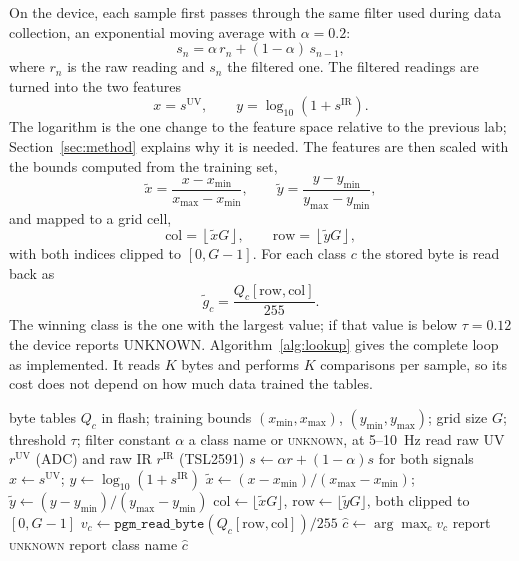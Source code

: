 \documentclass[10pt,a4paper,twocolumn]{article}
\begin{document}
On the device, each sample first passes through the same filter used during data collection, an exponential moving average with $\alpha = 0.2$:
\begin{equation}
s_n = \alpha\, r_n + (1-\alpha)\, s_{n-1},
\label{eq:ema}
\end{equation}
where $r_n$ is the raw reading and $s_n$ the filtered one. The filtered readings are turned into the two features
\begin{equation}
x = s^{\mathrm{UV}}, \qquad y = \log_{10}\!\left(1 + s^{\mathrm{IR}}\right).
\label{eq:features}
\end{equation}
The logarithm is the one change to the feature space relative to the previous lab; Section~\ref{sec:method} explains why it is needed. The features are then scaled with the bounds computed from the training set,
\begin{equation}
\tilde{x} = \frac{x-x_{\min}}{x_{\max}-x_{\min}},
\qquad
\tilde{y} = \frac{y-y_{\min}}{y_{\max}-y_{\min}},
\label{eq:scale}
\end{equation}
and mapped to a grid cell,
\begin{equation}
\mathrm{col} = \left\lfloor \tilde{x}G \right\rfloor,
\qquad
\mathrm{row} = \left\lfloor \tilde{y}G \right\rfloor,
\label{eq:index}
\end{equation}
with both indices clipped to $[0,G-1]$. For each class $c$ the stored byte is read back as
\begin{equation}
\tilde{g}_c = \frac{Q_c[\mathrm{row},\mathrm{col}]}{255}.
\label{eq:dequant}
\end{equation}
The winning class is the one with the largest value; if that value is below $\tau=0.12$ the device reports UNKNOWN. Algorithm~\ref{alg:lookup} gives the complete loop as implemented. It reads $K$ bytes and performs $K$ comparisons per sample, so its cost does not depend on how much data trained the tables.

\begin{algorithm}[!bt]
\caption{On-device inference loop (ESP32).}
\label{alg:lookup}
\begin{algorithmic}[1]
\Require byte tables $Q_c$ in flash; training bounds $(x_{\min},x_{\max})$, $(y_{\min},y_{\max})$; grid size $G$; threshold $\tau$; filter constant $\alpha$
\Ensure a class name or \textsc{unknown}, at 5--10~Hz
\Loop
  \State read raw UV $r^{\mathrm{UV}}$ (ADC) and raw IR $r^{\mathrm{IR}}$ (TSL2591)
  \State $s \gets \alpha r + (1-\alpha) s$ for both signals 
  \State $x \gets s^{\mathrm{UV}}$;\; $y \gets \log_{10}(1+s^{\mathrm{IR}})$
  \State $\tilde{x}\gets(x-x_{\min})/(x_{\max}-x_{\min})$;\; $\tilde{y}\gets(y-y_{\min})/(y_{\max}-y_{\min})$
  \State $\mathrm{col}\gets\lfloor\tilde{x}G\rfloor$, $\mathrm{row}\gets\lfloor\tilde{y}G\rfloor$, both clipped to $[0,G-1]$
    \State $v_c\gets \texttt{pgm\_read\_byte}(Q_c[\mathrm{row},\mathrm{col}])/255$
  \EndFor
  \State $\hat{c}\gets\arg\max_c v_c$
    \State report \textsc{unknown}
  \Else
    \State report class name $\hat{c}$
  \EndIf
\EndLoop
\end{algorithmic}
\end{algorithm}
\end{document}
